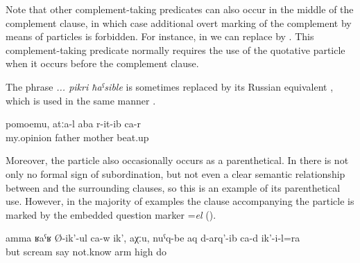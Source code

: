 Note that other complement-taking predicates can also occur in the middle of the complement clause, in which case additional overt marking of the complement by means of particles is forbidden. For instance, in  we can replace  by  . This complement-taking predicate normally requires the use of the quotative particle when it occurs before the complement clause.

The phrase \textit{... pikri ħaˁsible} is sometimes replaced by its Russian equivalent , which is used in the same manner . 
%
\begin{exe}
	\ex	\label{ex:In my mind, the father beat up the mother@23}
	\gll	pomoemu,	atːa-l	aba	r-it-ib	ca-r\\
		my.opinion	father	mother	beat.up	\\
	\glt	{}
\end{exe}

Moreover, the particle   also occasionally occurs as a parenthetical. In  there is not only no formal sign of subordination, but not even a clear semantic relationship between  and the surrounding clauses, so this is an example of its parenthetical use. However, in the majority of examples the clause accompanying the particle is marked by the embedded question marker =\textit{el} ().
%
\begin{exe}
	\ex	\label{ex:But he is screaming, I don't know, he also rose up his arms@21}
	\gll	amma	ʁaˁʁ Ø-ik'-ul ca-w	ik',	aχːu,	nuˁq-be	aq d-arq'-ib	ca-d	ik'-i-l=ra\\
		but	scream say 		not.know	arm		high do		\\
	\glt	{}
\end{exe}




